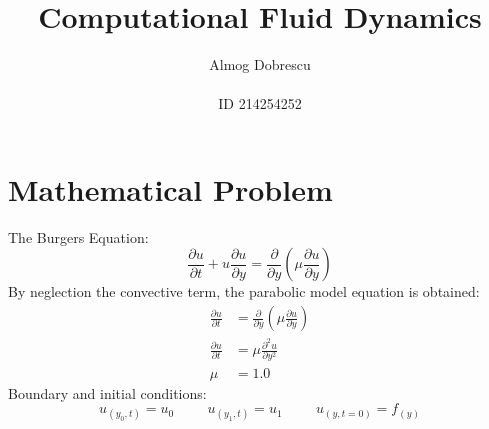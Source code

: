 \documentclass[11pt, a4paper]{article}
\title{Computational Fluid Dynamics}
\author{Almog Dobrescu\\\\ID 214254252}
\begin{document}
\maketitle

\thispagestyle{empty}
\newpage
\setcounter{page}{1}

\tableofcontents
\newpage

\section{Mathematical Problem}
The Burgers Equation:
\begin{equation}
    \frac{\partial u}{\partial t} + u\frac{\partial u}{\partial y} = \frac{\partial}{\partial y}\left(\mu\frac{\partial u}{\partial y}\right)
\end{equation}
By neglection the convective term, the parabolic model equation is obtained:
\begin{align}
    \frac{\partial u}{\partial t} &= \frac{\partial}{\partial y}\left(\mu\frac{\partial u}{\partial y}\right)\\
    \frac{\partial u}{\partial t} &= \mu\frac{\partial^2 u}{\partial y^2}\\
    \mu &= 1.0
\end{align}
Boundary and initial conditions:
\begin{equation}
    u_{(y_0, t)} = u_0 \hspace{1cm} u_{(y_1, t)} = u_1 \hspace{1cm} u_{(y, t=0)} = f_{(y)}
\end{equation}
\end{document}
